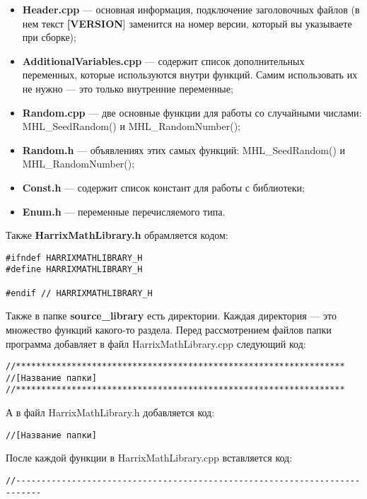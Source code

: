 \documentclass[a4paper,12pt]{article}
\begin{document}
\begin{itemize}
\item \textbf{Header.cpp} --- основная информация, подключение заголовочных файлов (в нем текст \textbf{[VERSION}] заменится на номер версии, который вы указываете при сборке);
\item \textbf{AdditionalVariables.cpp} --- содержит список дополнительных переменных, которые используются внутри функций. Самим использовать их не нужно --- это только внутренние переменные;
\item \textbf{Random.cpp} --- две основные функции для работы со случайными числами: MHL\_SeedRandom() и MHL\_RandomNumber();
\item \textbf{Random.h} --- объявлениях этих самых функций: MHL\_SeedRandom() и MHL\_RandomNumber();
\item \textbf{Const.h} --- содержит список констант для работы с библиотеки;
\item \textbf{Enum.h} --- переменные перечисляемого типа.
\end{itemize}

Также \textbf{HarrixMathLibrary.h} обрамляется кодом:
\begin{lstlisting}[label=make_sectioncpp,caption=Обрамление HarrixMathLibrary.h файла]
#ifndef HARRIXMATHLIBRARY_H
#define HARRIXMATHLIBRARY_H

#endif // HARRIXMATHLIBRARY_H
\end{lstlisting}

Также в папке \textbf{source\_library} есть директории. Каждая директория --- это множество функций какого-то раздела. Перед рассмотрением файлов папки программа добавляет в файл HarrixMathLibrary.cpp следующий код:

\begin{lstlisting}[label=make_sectioncpp,caption=Название раздела]
//*****************************************************************
//[Название папки]
//*****************************************************************
\end{lstlisting}

А в файл HarrixMathLibrary.h добавляется код:

\begin{lstlisting}[label=make_sectionh,caption=Название раздела]
//[Название папки]
\end{lstlisting}

После каждой функции в HarrixMathLibrary.cpp вставляется код:
\begin{lstlisting}[label=make_sectionh,caption=Название раздела]
//---------------------------------------------------------------------------
\end{lstlisting}
\end{document}
